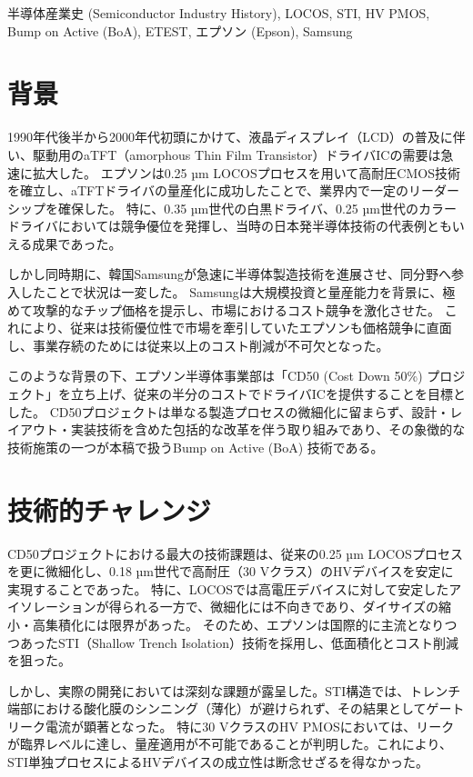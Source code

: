 \documentclass[conference]{IEEEtran}
\begin{document}
\begin{IEEEkeywords}
半導体産業史 (Semiconductor Industry History), LOCOS, STI, HV PMOS, 
Bump on Active (BoA), ETEST, エプソン (Epson), Samsung
\end{IEEEkeywords}

\section{背景}
1990年代後半から2000年代初頭にかけて、液晶ディスプレイ（LCD）の普及に伴い、駆動用のaTFT（amorphous Thin Film Transistor）ドライバICの需要は急速に拡大した。
エプソンは0.25 µm LOCOSプロセスを用いて高耐圧CMOS技術を確立し、aTFTドライバの量産化に成功したことで、業界内で一定のリーダーシップを確保した。
特に、0.35 µm世代の白黒ドライバ、0.25 µm世代のカラードライバにおいては競争優位を発揮し、当時の日本発半導体技術の代表例ともいえる成果であった。

しかし同時期に、韓国Samsungが急速に半導体製造技術を進展させ、同分野へ参入したことで状況は一変した。
Samsungは大規模投資と量産能力を背景に、極めて攻撃的なチップ価格を提示し、市場におけるコスト競争を激化させた。
これにより、従来は技術優位性で市場を牽引していたエプソンも価格競争に直面し、事業存続のためには従来以上のコスト削減が不可欠となった。

このような背景の下、エプソン半導体事業部は「CD50 (Cost Down 50\%) プロジェクト」を立ち上げ、従来の半分のコストでドライバICを提供することを目標とした。
CD50プロジェクトは単なる製造プロセスの微細化に留まらず、設計・レイアウト・実装技術を含めた包括的な改革を伴う取り組みであり、その象徴的な技術施策の一つが本稿で扱うBump on Active (BoA) 技術である。

\section{技術的チャレンジ}
CD50プロジェクトにおける最大の技術課題は、従来の0.25 µm LOCOSプロセスを更に微細化し、0.18 µm世代で高耐圧（30 Vクラス）のHVデバイスを安定に実現することであった。  
特に、LOCOSでは高電圧デバイスに対して安定したアイソレーションが得られる一方で、微細化には不向きであり、ダイサイズの縮小・高集積化には限界があった。  
そのため、エプソンは国際的に主流となりつつあったSTI（Shallow Trench Isolation）技術を採用し、低面積化とコスト削減を狙った。

しかし、実際の開発においては深刻な課題が露呈した。STI構造では、トレンチ端部における酸化膜のシンニング（薄化）が避けられず、その結果としてゲートリーク電流が顕著となった。  
特に30 VクラスのHV PMOSにおいては、リークが臨界レベルに達し、量産適用が不可能であることが判明した。これにより、STI単独プロセスによるHVデバイスの成立性は断念せざるを得なかった。
\end{document}
